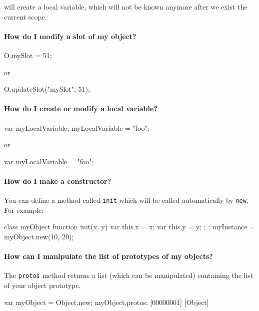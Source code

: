 \noindent
will create a local variable, which will not be known anymore after we
exist the current scope.

\paragraph{How do I modify a slot of my object?}
\begin{urbifixme}
O.mySlot = 51;
\end{urbifixme}

\noindent
or

\begin{urbifixme}
O.updateSlot("mySlot", 51);
\end{urbifixme}

\paragraph{How do I create or modify a local variable?}
\begin{urbifixme}
var myLocalVariable;
myLocalVariable = "foo";
\end{urbifixme}

\noindent
or

\begin{urbifixme}
var myLocalVariable = "foo";
\end{urbifixme}


\paragraph{How do I make a constructor?}
You can define a method called \lstinline{init} which will be called
automatically by \lstinline{new}. For example:

\begin{urbifixme}
class myObject {
  function init(x, y) {
    var this.x = x;
    var this.y = y;
  };
};
myInstance = myObject.new(10, 20);
\end{urbifixme}


\paragraph{How can I manipulate the list of prototypes of my objects?}
The \lstinline{protos} method returns a list (which can be manipulated)
containing the list of your object prototype.

\begin{urbifixme}
var myObject = Object.new;
myObject.protos;
[00000001] [Object]
\end{urbifixme}

